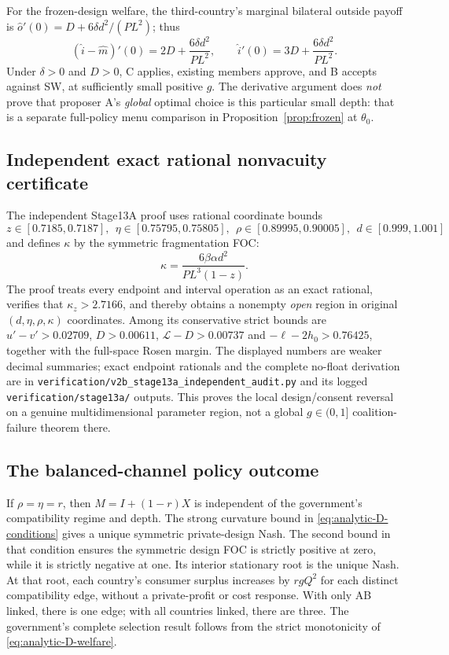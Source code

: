 For the frozen-design welfare, the
third-country's marginal bilateral outside payoff is
$\widehat o'(0)=D+6\delta d^2/(PL^2)$;
thus
\[
 (\widehat i-\widehat m)'(0)
 =2D+\frac{6\delta d^2}{PL^2},\qquad
 \widehat i'(0)=3D+\frac{6\delta d^2}{PL^2}.
\]
Under $\delta>0$ and $D>0$, C applies,
existing members approve, and B accepts
against SW, at sufficiently small positive $g$.
The derivative argument does \emph{not} prove
that proposer A's \emph{global} optimal
choice is this particular small depth:
that is a separate full-policy menu comparison
in Proposition~\ref{prop:frozen} at $\theta_0$.

\subsection{Independent exact rational nonvacuity certificate}

The independent Stage13A proof uses rational
coordinate bounds
\[
 z\in[0.7185,0.7187],\ \
 \eta\in[0.75795,0.75805],\ \
 \rho\in[0.89995,0.90005],\ \
 d\in[0.999,1.001]
\]
and defines $\kappa$ by the symmetric
fragmentation FOC:
\[
 \kappa=\frac{6\beta\alpha d^2}
 {PL^3(1-z)}.
\]
The proof treats every endpoint and interval
operation as an exact rational, verifies that
$\kappa_z>2.7166$, and thereby obtains
a nonempty \emph{open} region in original
$(d,\eta,\rho,\kappa)$ coordinates.
Among its conservative strict bounds are
$u'-v'>0.02709$, $D>0.00611$,
$\mathcal L-D>0.00737$ and
$-\ell-2h_0>0.76425$, together with the
full-space Rosen margin. The displayed
numbers are weaker decimal summaries;
exact endpoint rationals and the complete
no-float derivation are in
\texttt{verification/v2b\_stage13a\_independent\_audit.py}
and its logged \texttt{verification/stage13a/}
outputs. This proves the local design/consent
reversal on a genuine multidimensional
parameter region, not a global
$g\in(0,1]$ coalition-failure theorem there.

\subsection{The balanced-channel policy outcome}

If $\rho=\eta=r$, then
$M=I+(1-r)X$ is independent of the
government's compatibility regime and depth.
The strong curvature bound in
\eqref{eq:analytic-D-conditions} gives a
unique symmetric private-design Nash.
The second bound in that condition ensures
the symmetric design FOC is strictly
positive at zero, while it is strictly
negative at one. Its interior stationary
root is the unique Nash. At that root,
each country's consumer surplus increases
by $rgQ^2$ for each distinct compatibility
edge, without a private-profit or cost
response. With only AB linked, there is one
edge; with all countries linked, there are
three. The government's complete selection
result follows from the strict monotonicity
of \eqref{eq:analytic-D-welfare}.
